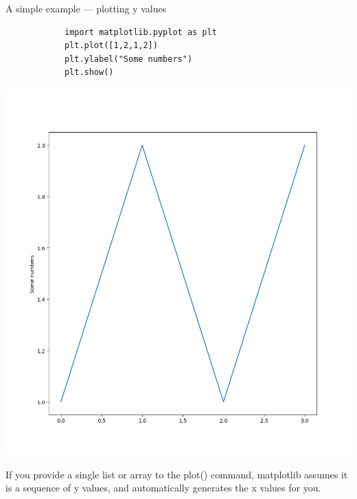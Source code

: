 \documentclass[aspectratio=169,handout]{beamer}
\begin{document}
\begin{frame}[fragile]{A simple example --- plotting y values}
    \begin{minipage}{0.49\textwidth}
        \begin{verbatim}
            import matplotlib.pyplot as plt
            plt.plot([1,2,1,2])
            plt.ylabel("Some numbers")
            plt.show()
        \end{verbatim}
    \end{minipage}
    \pause
    \begin{minipage}{0.49\textwidth}
        \centering
        \includegraphics[width=.8\textwidth]{./plots/plot1.png}
    \end{minipage}

    If you provide a single list or array to the plot() command, matplotlib assumes it is a sequence of y values, and
    automatically generates the x values for you.
\end{frame}
\end{document}
